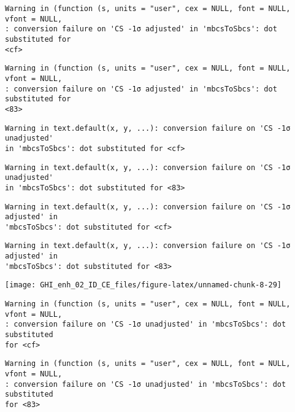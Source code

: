 \documentclass[
  10pt,
  a4paper,oneside]{article}
\begin{document}
\begin{verbatim}
Warning in (function (s, units = "user", cex = NULL, font = NULL, vfont = NULL,
: conversion failure on 'CS -1σ adjusted' in 'mbcsToSbcs': dot substituted for
<cf>
\end{verbatim}

\begin{verbatim}
Warning in (function (s, units = "user", cex = NULL, font = NULL, vfont = NULL,
: conversion failure on 'CS -1σ adjusted' in 'mbcsToSbcs': dot substituted for
<83>
\end{verbatim}

\begin{verbatim}
Warning in text.default(x, y, ...): conversion failure on 'CS -1σ unadjusted'
in 'mbcsToSbcs': dot substituted for <cf>
\end{verbatim}

\begin{verbatim}
Warning in text.default(x, y, ...): conversion failure on 'CS -1σ unadjusted'
in 'mbcsToSbcs': dot substituted for <83>
\end{verbatim}

\begin{verbatim}
Warning in text.default(x, y, ...): conversion failure on 'CS -1σ adjusted' in
'mbcsToSbcs': dot substituted for <cf>
\end{verbatim}

\begin{verbatim}
Warning in text.default(x, y, ...): conversion failure on 'CS -1σ adjusted' in
'mbcsToSbcs': dot substituted for <83>
\end{verbatim}

\begin{center}\texttt{[image: GHI\_enh\_02\_ID\_CE\_files/figure-latex/unnamed-chunk-8-29]} \end{center}

\begin{verbatim}
Warning in (function (s, units = "user", cex = NULL, font = NULL, vfont = NULL,
: conversion failure on 'CS -1σ unadjusted' in 'mbcsToSbcs': dot substituted
for <cf>
\end{verbatim}

\begin{verbatim}
Warning in (function (s, units = "user", cex = NULL, font = NULL, vfont = NULL,
: conversion failure on 'CS -1σ unadjusted' in 'mbcsToSbcs': dot substituted
for <83>
\end{verbatim}
\end{document}
